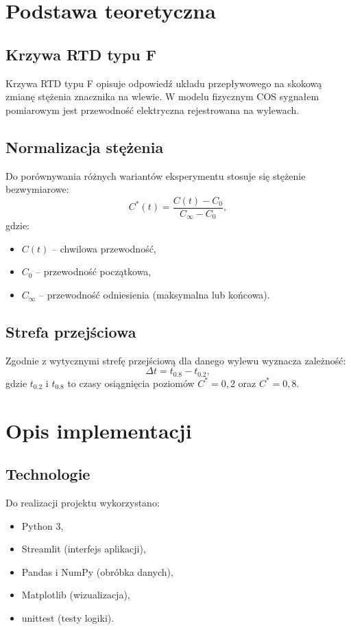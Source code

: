 \documentclass[12pt,a4paper]{article}
\begin{document}
\section{Podstawa teoretyczna}
\subsection{Krzywa RTD typu F}
Krzywa RTD typu F opisuje odpowiedź układu przepływowego na skokową zmianę stężenia znacznika na wlewie. W modelu fizycznym COS sygnałem pomiarowym jest przewodność elektryczna rejestrowana na wylewach.

\subsection{Normalizacja stężenia}
Do porównywania różnych wariantów eksperymentu stosuje się stężenie bezwymiarowe:
\begin{equation}
    C^*(t)=\frac{C(t)-C_0}{C_\infty-C_0},
\end{equation}
gdzie:
\begin{itemize}
    \item \(C(t)\) -- chwilowa przewodność,
    \item \(C_0\) -- przewodność początkowa,
    \item \(C_\infty\) -- przewodność odniesienia (maksymalna lub końcowa).
\end{itemize}

\subsection{Strefa przejściowa}
Zgodnie z wytycznymi strefę przejściową dla danego wylewu wyznacza zależność:
\begin{equation}
    \Delta t = t_{0.8} - t_{0.2},
\end{equation}
gdzie \(t_{0.2}\) i \(t_{0.8}\) to czasy osiągnięcia poziomów \(C^*=0{,}2\) oraz \(C^*=0{,}8\).

\section{Opis implementacji}
\subsection{Technologie}
Do realizacji projektu wykorzystano:
\begin{itemize}
    \item Python 3,
    \item Streamlit (interfejs aplikacji),
    \item Pandas i NumPy (obróbka danych),
    \item Matplotlib (wizualizacja),
    \item unittest (testy logiki).
\end{itemize}
\end{document}
